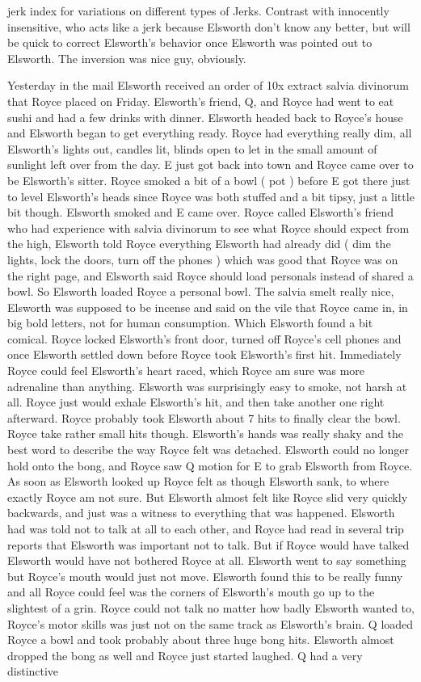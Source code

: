 \documentclass[12pt]{book}
\begin{document}
jerk index for variations on different types of Jerks. Contrast with innocently insensitive, who acts like a jerk because Elsworth don't know any better, but will be quick to correct Elsworth's behavior once Elsworth was pointed out to Elsworth. The inversion was nice guy, obviously.



Yesterday in the mail Elsworth received an order of 10x extract salvia divinorum that Royce placed on Friday. Elsworth's friend, Q, and Royce had went to eat sushi and had a few drinks with dinner. Elsworth headed back to Royce's house and Elsworth began to get everything ready. Royce had everything really dim, all Elsworth's lights out, candles lit, blinds open to let in the small amount of sunlight left over from the day. E just got back into town and Royce came over to be Elsworth's sitter. Royce smoked a bit of a bowl ( pot ) before E got there just to level Elsworth's heads since Royce was both stuffed and a bit tipsy, just a little bit though. Elsworth smoked and E came over. Royce called Elsworth's friend who had experience with salvia divinorum to see what Royce should expect from the high, Elsworth told Royce everything Elsworth had already did ( dim the lights, lock the doors, turn off the phones ) which was good that Royce was on the right page, and Elsworth said Royce should load personals instead of shared a bowl. So Elsworth loaded Royce a personal bowl. The salvia smelt really nice, Elsworth was supposed to be incense and said on the vile that Royce came in, in big bold letters, not for human consumption. Which Elsworth found a bit comical. Royce locked Elsworth's front door, turned off Royce's cell phones and once Elsworth settled down before Royce took Elsworth's first hit. Immediately Royce could feel Elsworth's heart raced, which Royce am sure was more adrenaline than anything. Elsworth was surprisingly easy to smoke, not harsh at all. Royce just would exhale Elsworth's hit, and then take another one right afterward. Royce probably took Elsworth about 7 hits to finally clear the bowl. Royce take rather small hits though. Elsworth's hands was really shaky and the best word to describe the way Royce felt was detached. Elsworth could no longer hold onto the bong, and Royce saw Q motion for E to grab Elsworth from Royce. As soon as Elsworth looked up Royce felt as though Elsworth sank, to where exactly Royce am not sure. But Elsworth almost felt like Royce slid very quickly backwards, and just was a witness to everything that was happened. Elsworth had was told not to talk at all to each other, and Royce had read in several trip reports that Elsworth was important not to talk. But if Royce would have talked Elsworth would have not bothered Royce at all. Elsworth went to say something but Royce's mouth would just not move. Elsworth found this to be really funny and all Royce could feel was the corners of Elsworth's mouth go up to the slightest of a grin. Royce could not talk no matter how badly Elsworth wanted to, Royce's motor skills was just not on the same track as Elsworth's brain. Q loaded Royce a bowl and took probably about three huge bong hits. Elsworth almost dropped the bong as well and Royce just started laughed. Q had a very distinctive 
\end{document}
